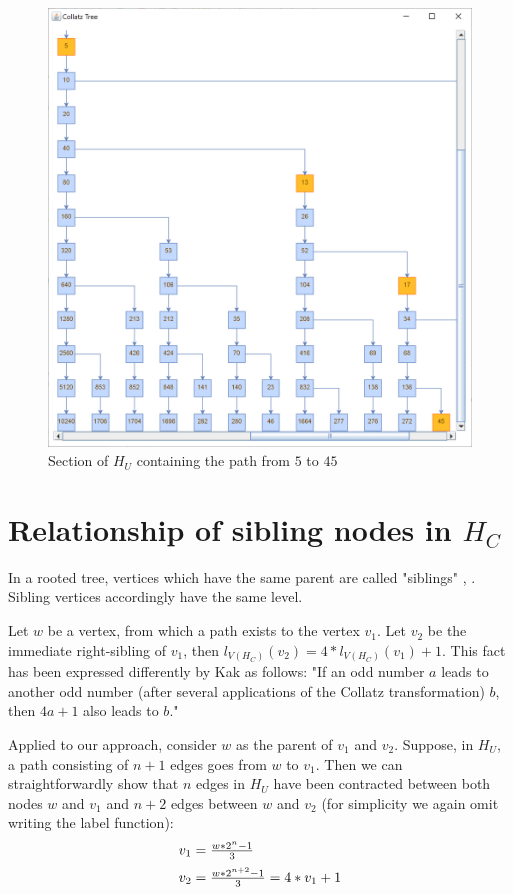 \begin{figure}
	\includegraphics[width=1.00\textwidth]{figures/h_u.png}
	\caption{Section of $H_U$ containing the path from $5$ to $45$}
	\label{fig:3}
\end{figure}

\section{Relationship of sibling nodes in \mbox{$H_C$}}
In a rooted tree, vertices which have the same parent are called "siblings" \cite[p.~702]{Ref_Johnsonbaugh}, \cite[p.~747]{Ref_Rosen}. Sibling vertices accordingly have the same level.

\par\medskip
Let $w$ be a vertex, from which a path exists to the vertex $v_1$. Let $v_2$ be the immediate right-sibling of $v_1$, then $l_{V\left(H_C\right)}\left(v_2\right)=4*l_{V\left(H_C\right)}\left(v_1\right)+1$. This fact has been expressed differently by Kak \cite{Ref_Kak_2014} as follows: "If an odd number $a$ leads to another odd number (after several applications of the Collatz transformation) $b$, then $4a+1$ also leads to $b$."

\par\medskip
Applied to our approach, consider $w$ as the parent of $v_1$ and $v_2$. Suppose, in $H_U$, a path consisting of $n+1$ edges goes from $w$ to $v_1$. Then we can straightforwardly show that $n$ edges in $H_U$ have been contracted between both nodes $w$ and $v_1$ and $n+2$ edges between $w$ and $v_2$ (for simplicity we again omit writing the label function):
\begin{equation*}
\begin{array}{l}
		v_1=\frac{w*2^n-1}{3}
		\\[\medskipamount]
		v_2=\frac{w*2^{n+2}-1}{3}=4*v_1+1
\end{array}
\end{equation*}

